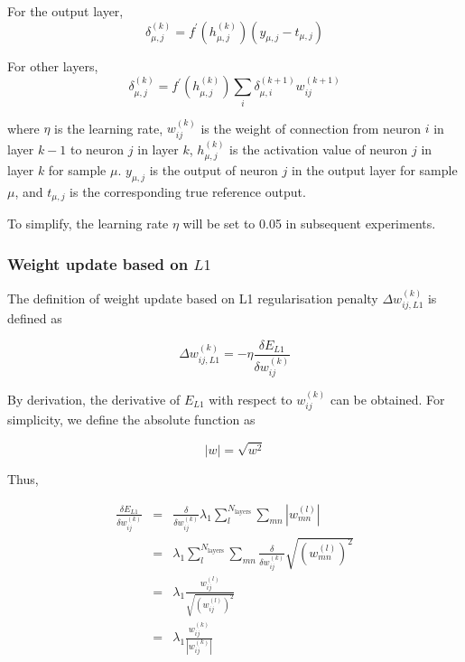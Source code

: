 \documentclass[conference]{IEEEtran}
\begin{document}
For the output layer,
\begin{equation}
    \delta_{\mu,j}^{(k)}=f^{'}\left(h^{(k)}_{\mu,j}\right)\left(y_{\mu,j}-t_{\mu,j}\right)
\end{equation}

For other layers,
\begin{equation}
    \delta_{\mu,j}^{(k)}=f^{'}\left(h^{(k)}_{\mu,j}\right)\sum_i\delta^{(k+1)}_{\mu,i}w^{(k+1)}_{ij}
\end{equation}

where \({\eta}\) is the learning rate, \(w^{(k)}_{ij}\) is the weight of connection from neuron \(i\) in layer \(k-1\) to neuron \(j\) in layer \(k\), \(h^{(k)}_{\mu,j}\) is the activation value of neuron \(j\) in layer \(k\) for sample \({\mu}\). \(y_{\mu,j}\) is the output of neuron \(j\) in the output layer for sample \({\mu}\), and \(t_{\mu,j}\) is the corresponding true reference output.

To simplify, the learning rate \({\eta}\) will be set to 0.05 in subsequent experiments.

\subsubsection{Weight update based on \(L1\)}

The definition of weight update based on L1 regularisation penalty \(\Delta w_{ij,L1}^{(k)}\) is defined as

\begin{equation}
    \Delta w_{ij,L1}^{(k)} = -\eta\frac{\delta E_{L1}}{\delta w^{(k)}_{ij}}
\end{equation}

By derivation, the derivative of \(E_{L1}\) with respect to \(w_{ij}^{(k)}\) can be obtained. For simplicity, we define the absolute function as

\begin{equation}
    \left|w\right|=\sqrt{w^2}
\end{equation}

Thus,

\begin{eqnarray}
    \frac{\delta E_{L1}}{\delta w_{ij}^{(k)}}
    &=& \frac{\delta}{\delta w_{ij}^{(k)}} \lambda_1\sum_l^{N_\text{layers}}\sum_{mn}\left|w_{mn}^{(l)}\right|
    \\
    &=&  \lambda_1\sum_l^{N_\text{layers}}\sum_{mn}\frac{\delta}{\delta w_{ij}^{(k)}}\sqrt{{\left(w_{mn}^{(l)}\right)}^2}
    \\
    &=& \lambda_1\frac{w_{ij}^{(l)}}{\sqrt{{\left( w_{ij}^{(l)}\right)}^2}}
    \\
    &=& \lambda_1\frac{w_{ij}^{(k)}}{\left|w_{ij}^{(k)}\right|}
\end{eqnarray}
\end{document}
